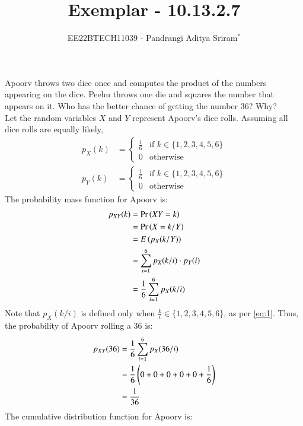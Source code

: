 \documentclass[journal,12pt,twocolumn]{IEEEtran}
\theoremstyle{remark}
\begin{document}

\vspace{3cm}

\title{Exemplar - 10.13.2.7}
\author{EE22BTECH11039 - Pandrangi Aditya Sriram$^{*}$%
}
\maketitle
\newpage
\bigskip

\renewcommand{\thefigure}{\theenumi}
\renewcommand{\thetable}{\theenumi}

Apoorv throws two dice once and computes the product of the numbers appearing
on the dice. Peehu throws one die and squares the number that appears on it. Who
has the better chance of getting the number 36? Why?\\\solution
Let the random variables $X$ and $Y$ represent Apoorv's dice rolls. Assuming all dice rolls are equally likely,
\begin{align}
    p_X(k) &= 
    \begin{cases}
        \frac{1}{6} & \text{if }k \in \{1, 2, 3, 4, 5, 6\}\\
        0 & \text{otherwise}
    \end{cases}\label{eq:1}\\
    p_Y(k) &=
    \begin{cases}
        \frac{1}{6} & \text{if }k \in \{1, 2, 3, 4, 5, 6\}\\
        0 & \text{otherwise}
    \end{cases}
\end{align}
The probability mass function for Apoorv is:
\begin{align}
    p_{XY}(k) &= \Pr\left(XY = k\right)\\
    &= \Pr\left(X = k/Y\right)\\
    &= E\left(p_X(k/Y)\right)\\
    &= \sum_{i = 1}^{6} p_X(k/i) \cdot p_Y(i)\\
    &= \frac{1}{6} \sum_{i = 1}^{6} p_X(k/i)
\end{align}
Note that $p_X(k/i)$ is defined only when $\frac{k}{i} \in \{1, 2, 3, 4, 5, 6\}$, as per \eqref{eq:1}.
Thus, the probability of Apoorv rolling a 36 is:
\begin{align}
    p_{XY}(36) &= \frac{1}{6} \sum_{i = 1}^{6} p_X(36/i)\\
    &= \frac{1}{6}\left(0 + 0 + 0 + 0 + 0 + \frac{1}{6}\right)\\
    &= \frac{1}{36}
\end{align}
The cumulative distribution function for Apoorv is:
\end{document}
